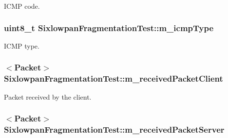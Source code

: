 I\+C\+MP code. 

\subsubsection[{\texorpdfstring{m\+\_\+icmp\+Type}{m_icmpType}}]{\setlength{\rightskip}{0pt plus 5cm}uint8\+\_\+t Sixlowpan\+Fragmentation\+Test\+::m\+\_\+icmp\+Type\hspace{0.3cm}{\ttfamily [private]}}\hypertarget{classSixlowpanFragmentationTest_a0754fe2c0e0ade8b02cfe76ff5125171}{}\label{classSixlowpanFragmentationTest_a0754fe2c0e0ade8b02cfe76ff5125171}


I\+C\+MP type. 

\subsubsection[{\texorpdfstring{m\+\_\+received\+Packet\+Client}{m_receivedPacketClient}}]{$<${\bf Packet}$>$ Sixlowpan\+Fragmentation\+Test\+::m\+\_\+received\+Packet\+Client\hspace{0.3cm}{\ttfamily [private]}}\hypertarget{classSixlowpanFragmentationTest_aef2a91785b934e5a820b0286dbbec514}{}\label{classSixlowpanFragmentationTest_aef2a91785b934e5a820b0286dbbec514}


Packet received by the client. 

\subsubsection[{\texorpdfstring{m\+\_\+received\+Packet\+Server}{m_receivedPacketServer}}]{$<${\bf Packet}$>$ Sixlowpan\+Fragmentation\+Test\+::m\+\_\+received\+Packet\+Server\hspace{0.3cm}{\ttfamily [private]}}\hypertarget{classSixlowpanFragmentationTest_a783ec541df1eacec01158508ad4a03cb}{}\label{classSixlowpanFragmentationTest_a783ec541df1eacec01158508ad4a03cb}


